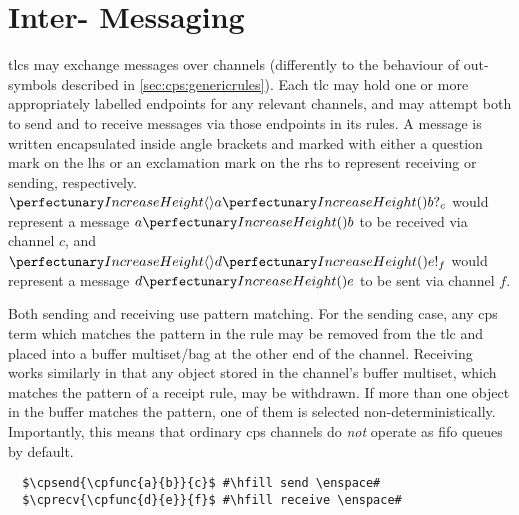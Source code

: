 \section{\label{sec:cps:intertlcmess}Inter- Messaging}

\Glspl{tlc} may exchange messages over channels (differently to the behaviour of out-symbols described in \cref{sec:cps:genericrules}).  Each \gls{tlc} may hold one or more appropriately labelled endpoints for any relevant channels, and may attempt both to send and to receive messages via those endpoints in its rules.  A message is written encapsulated inside angle brackets and marked with either a question mark on the \gls{lhs} or an exclamation mark on the \gls{rhs} to represent receiving or sending, respectively.  \Eg{} \(\cprecv{\cpfunc{a}{b}}{c}\) would represent a message \(\cpfunc{a}{b}\) to be received via channel \(c\), and \(\cpsend{\cpfunc{d}{e}}{f}\) would represent a message \(\cpfunc{d}{e}\) to be sent via channel \(f\).

Both sending and receiving use pattern matching.  For the sending case, any \gls{cps} term which matches the pattern in the rule may be removed from the \gls{tlc} and placed into a buffer multiset/bag at the other end of the channel.  Receiving works similarly in that any object stored in the channel's buffer multiset, which matches the pattern of a receipt rule, may be withdrawn.  If more than one object in the buffer matches the pattern, one of them is selected non-deterministically.  Importantly, this means that ordinary \gls{cps} channels do \emph{not} operate as \gls{fifo} queues by default.

\lstset{xleftmargin=.5in, xrightmargin=.5in} 
\begin{lstlisting}
  $\cpsend{\cpfunc{a}{b}}{c}$ #\hfill send \enspace#
  $\cprecv{\cpfunc{d}{e}}{f}$ #\hfill receive \enspace#
\end{lstlisting}


